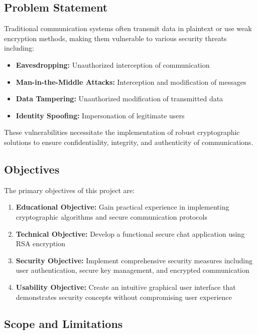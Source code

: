 \documentclass[12pt,a4paper]{article}
\begin{document}
\subsection{Problem Statement}

Traditional communication systems often transmit data in plaintext or use weak encryption methods, making them vulnerable to various security threats including:

\begin{itemize}
    \item \textbf{Eavesdropping:} Unauthorized interception of communication
    \item \textbf{Man-in-the-Middle Attacks:} Interception and modification of messages
    \item \textbf{Data Tampering:} Unauthorized modification of transmitted data
    \item \textbf{Identity Spoofing:} Impersonation of legitimate users
\end{itemize}

These vulnerabilities necessitate the implementation of robust cryptographic solutions to ensure confidentiality, integrity, and authenticity of communications.

\subsection{Objectives}

The primary objectives of this project are:

\begin{enumerate}
    \item \textbf{Educational Objective:} Gain practical experience in implementing cryptographic algorithms and secure communication protocols
    \item \textbf{Technical Objective:} Develop a functional secure chat application using RSA encryption
    \item \textbf{Security Objective:} Implement comprehensive security measures including user authentication, secure key management, and encrypted communication
    \item \textbf{Usability Objective:} Create an intuitive graphical user interface that demonstrates security concepts without compromising user experience
\end{enumerate}

\subsection{Scope and Limitations}
\end{document}
